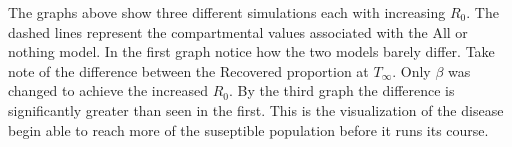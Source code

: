 \documentclass{report}
\begin{document}
The graphs above show three different simulations each with increasing $R_0$. The dashed lines represent the compartmental values associated with the All or nothing model. In the first graph notice how the two models barely differ. Take note of the difference between the Recovered proportion at $T_{\infty}$. Only $\beta$ was changed to achieve the increased $R_0$. By the third graph the difference is significantly greater than seen in the first. This is the visualization of the disease begin able to reach more of the suseptible population before it runs its course.
\end{document}
